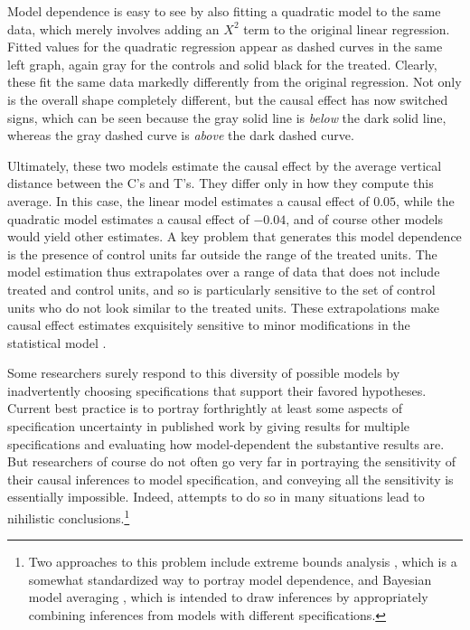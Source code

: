 \documentclass[11pt,titlepage]{article}
\begin{document}
Model dependence is easy to see by also fitting a quadratic model to
the same data, which merely involves adding an $X^2$ term to the
original linear regression.  Fitted values for the quadratic
regression appear as dashed curves in the same left graph, again gray
for the controls and solid black for the treated.  Clearly, these fit
the same data markedly differently from the original regression.  Not
only is the overall shape completely different, but the causal effect
has now switched signs, which can be seen because the gray solid line
is \emph{below} the dark solid line, whereas the gray dashed curve is
\emph{above} the dark dashed curve.

Ultimately, these two models estimate the causal effect by the average
vertical distance between the C's and T's.  They differ only in how
they compute this average.  In this case, the linear model estimates a
causal effect of $0.05$, while the quadratic model estimates a causal
effect of $-0.04$, and of course other models would yield other
estimates.  A key problem that generates this model dependence is the
presence of control units far outside the range of the treated units.
The model estimation thus extrapolates over a range of data that does
not include treated and control units, and so is particularly
sensitive to the set of control units who do not look similar to the
treated units.  These extrapolations make causal effect estimates
exquisitely sensitive to minor modifications in the statistical model
\citep{KinZen06a}.

Some researchers surely respond to this diversity of possible models
by inadvertently choosing specifications that support their favored
hypotheses.  Current best practice is to portray forthrightly at least
some aspects of specification uncertainty in published work by giving
results for multiple specifications and evaluating how model-dependent
the substantive results are.  But researchers of course do not often
go very far in portraying the sensitivity of their causal inferences
to model specification, and conveying all the sensitivity is
essentially impossible.  Indeed, attempts to do so in many situations
lead to nihilistic conclusions.\footnote{Two approaches to this
  problem include extreme bounds analysis \citep{Leamer78}, which is a
  somewhat standardized way to portray model dependence, and Bayesian
  model averaging \citep{HoeMadRaf99,ImaKin04}, which is intended to
  draw inferences by appropriately combining inferences from models
  with different specifications.}
\end{document}
